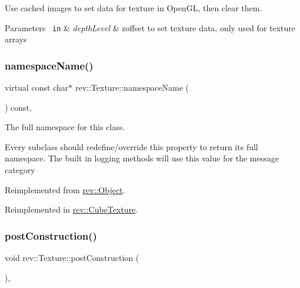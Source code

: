 Use cached images to set data for texture in Open\+GL, then clear them. 


\begin{DoxyParams}[1]{Parameters}
\mbox{\texttt{ in}}  & {\em depth\+Level} & zoffset to set texture data, only used for texture arrays \\
\hline
\end{DoxyParams}
\mbox{\label{classrev_1_1_texture_ad26e3169ee1055c346487f0db2f4ce94}} 
\subsubsection{\texorpdfstring{namespaceName()}{namespaceName()}}
{\footnotesize\ttfamily virtual const char$\ast$ rev\+::\+Texture\+::namespace\+Name (\begin{DoxyParamCaption}{ }\end{DoxyParamCaption}) const\hspace{0.3cm}{\ttfamily [inline]}, {\ttfamily [virtual]}}



The full namespace for this class. 

Every subclass should redefine/override this property to return its full namespace. The built in logging methods will use this value for the message category 

Reimplemented from \mbox{\hyperlink{classrev_1_1_object_aaeb638d3e10f361c56c211a318a27f3d}{rev\+::\+Object}}.



Reimplemented in \mbox{\hyperlink{classrev_1_1_cube_texture_af6794b135f279b1b011d47f9a7f9d10b}{rev\+::\+Cube\+Texture}}.

\mbox{\label{classrev_1_1_texture_aaa505679ad69f466e6aa9027e0419684}} 
\subsubsection{\texorpdfstring{postConstruction()}{postConstruction()}}
{\footnotesize\ttfamily void rev\+::\+Texture\+::post\+Construction (\begin{DoxyParamCaption}{ }\end{DoxyParamCaption})\hspace{0.3cm}{\ttfamily [override]}, {\ttfamily [virtual]}}



